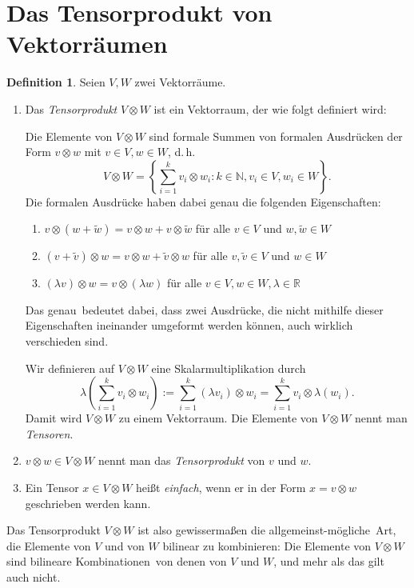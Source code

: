 \documentclass[a4paper]{scrreprt}
\numberwithin{equation}{chapter}
\newcommand{\R}{\mathbb{R}}
\theoremstyle{definition}
\newtheorem{defn}{Definition}[section]
\begin{document}
\section{Das Tensorprodukt von Vektorräumen}
\begin{defn} \label{defn:tensor_prod}
	Seien $V,W$ zwei Vektorräume.
	\begin{enumerate}[label=(\alph*)]
		\item Das \emph{Tensorprodukt} $V\otimes W$ ist ein Vektorraum, der wie folgt definiert wird:

			Die Elemente von $V\otimes W$ sind formale Summen von formalen Ausdrücken der Form $v\otimes w$ mit $v\in V, w\in W$, d.\,h.
			\[V\otimes W = \left\{\sum_{i=1}^k v_i \otimes w_i : k\in\mathbb N, v_i \in V, w_i \in W\right\}.\]
			Die formalen Ausdrücke haben dabei genau die folgenden Eigenschaften:
			\begin{enumerate}[label=(\roman*)]
				\item $v \otimes (w + \tilde w) = v\otimes w + v \otimes \tilde w$ für alle $v \in V$ und $w, \tilde w \in W$
				\item $(v + \tilde v) \otimes w = v\otimes w + \tilde v \otimes w$ für alle $v, \tilde v \in V$ und $w \in W$
				\item $(\lambda v) \otimes w = v \otimes (\lambda w)$ für alle $v\in V, w\in W, \lambda \in \R$
			\end{enumerate}
			Das \glqq genau\grqq\ bedeutet dabei, dass zwei Ausdrücke, die nicht mithilfe dieser Eigenschaften ineinander umgeformt werden können, auch wirklich verschieden sind.

			Wir definieren auf $V\otimes W$ eine Skalarmultiplikation durch
			\[\lambda\left(\sum_{i=1}^k v_i \otimes w_i\right) := \sum_{i=1}^k (\lambda v_i) \otimes w_i = \sum_{i=1}^k v_i \otimes \lambda(w_i).\]
			Damit wird $V\otimes W$ zu einem Vektorraum. Die Elemente von $V \otimes W$ nennt man \emph{Tensoren}.
		\item $v\otimes w \in V \otimes W$ nennt man das \emph{Tensorprodukt} von $v$ und $w$.
		\item Ein Tensor $x \in V \otimes W$ heißt \emph{einfach}, wenn er in der Form $x = v\otimes w$ geschrieben werden kann.
	\end{enumerate}
\end{defn}
Das Tensorprodukt $V\otimes W$ ist also gewissermaßen die \glqq allgemeinst-mögliche\grqq\ Art, die Elemente von $V$ und von $W$ bilinear zu kombinieren: Die Elemente von $V\otimes W$ sind \glqq bilineare Kombinationen\grqq\ von denen von $V$ und $W$, und mehr als das gilt auch nicht.
\end{document}

